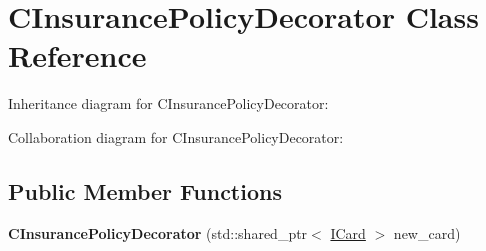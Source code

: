 \hypertarget{classCInsurancePolicyDecorator}{}\section{C\+Insurance\+Policy\+Decorator Class Reference}
\label{classCInsurancePolicyDecorator}


Inheritance diagram for C\+Insurance\+Policy\+Decorator\+:


Collaboration diagram for C\+Insurance\+Policy\+Decorator\+:
\subsection*{Public Member Functions}
\begin{DoxyCompactItemize}
\item 
{\bfseries C\+Insurance\+Policy\+Decorator} (std\+::shared\+\_\+ptr$<$ \hyperlink{classICard}{I\+Card} $>$ new\+\_\+card)\hypertarget{classCInsurancePolicyDecorator_a93ea0be7631178a04ffaa33a74b64058}{}\label{classCInsurancePolicyDecorator_a93ea0be7631178a04ffaa33a74b64058}


\end{DoxyCompactItemize}
